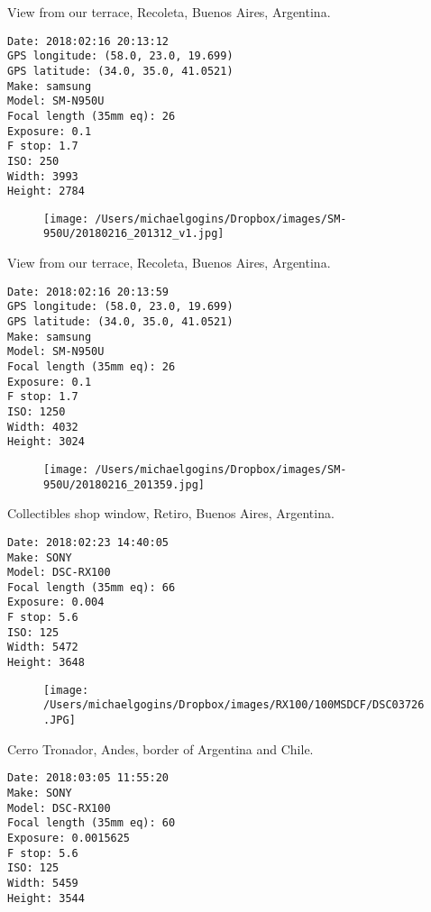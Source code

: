 \documentclass[11pt,letter,DIV=14,paper=landscape]{scrbook}
\begin{document}
\clearpage
\noindent View from our terrace, Recoleta, Buenos Aires, Argentina.
\noindent
\begin{lstlisting}
Date: 2018:02:16 20:13:12
GPS longitude: (58.0, 23.0, 19.699)
GPS latitude: (34.0, 35.0, 41.0521)
Make: samsung
Model: SM-N950U
Focal length (35mm eq): 26
Exposure: 0.1
F stop: 1.7
ISO: 250
Width: 3993
Height: 2784
\end{lstlisting}
\clearpage

\begin{figure}
\texttt{[image: /Users/michaelgogins/Dropbox/images/SM-950U/20180216\_201312\_v1.jpg]}
\end{figure}
    
\clearpage
\noindent View from our terrace, Recoleta, Buenos Aires, Argentina.
\noindent
\begin{lstlisting}
Date: 2018:02:16 20:13:59
GPS longitude: (58.0, 23.0, 19.699)
GPS latitude: (34.0, 35.0, 41.0521)
Make: samsung
Model: SM-N950U
Focal length (35mm eq): 26
Exposure: 0.1
F stop: 1.7
ISO: 1250
Width: 4032
Height: 3024
\end{lstlisting}
\clearpage

\begin{figure}
\texttt{[image: /Users/michaelgogins/Dropbox/images/SM-950U/20180216\_201359.jpg]}
\end{figure}
    
\clearpage
\noindent Collectibles shop window, Retiro, Buenos Aires, Argentina.
\noindent
\begin{lstlisting}
Date: 2018:02:23 14:40:05
Make: SONY
Model: DSC-RX100
Focal length (35mm eq): 66
Exposure: 0.004
F stop: 5.6
ISO: 125
Width: 5472
Height: 3648
\end{lstlisting}
\clearpage

\begin{figure}
\texttt{[image: /Users/michaelgogins/Dropbox/images/RX100/100MSDCF/DSC03726.JPG]}
\end{figure}
    
\clearpage
\noindent Cerro Tronador, Andes, border of Argentina and Chile.
\noindent
\begin{lstlisting}
Date: 2018:03:05 11:55:20
Make: SONY
Model: DSC-RX100
Focal length (35mm eq): 60
Exposure: 0.0015625
F stop: 5.6
ISO: 125
Width: 5459
Height: 3544
\end{lstlisting}
\clearpage
\end{document}
